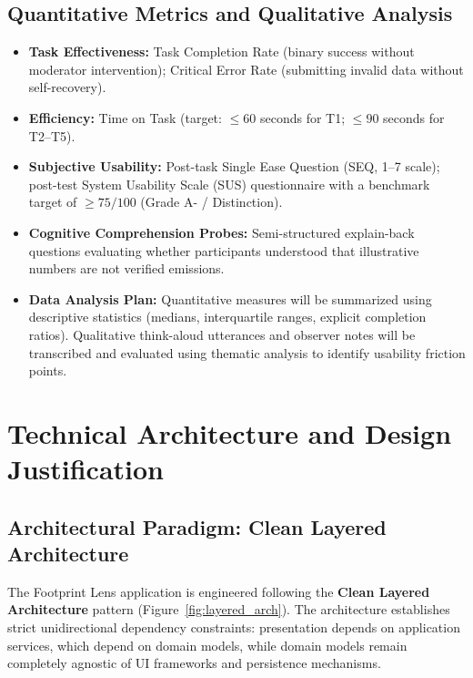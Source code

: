 \documentclass[12pt,a4paper]{article}
\begin{document}
\subsection{Quantitative Metrics and Qualitative Analysis}
\begin{itemize}[leftmargin=*]
  \item \textbf{Task Effectiveness:} Task Completion Rate (binary success without moderator intervention); Critical Error Rate (submitting invalid data without self-recovery).
  \item \textbf{Efficiency:} Time on Task (target: $\le 60$ seconds for T1; $\le 90$ seconds for T2--T5).
  \item \textbf{Subjective Usability:} Post-task Single Ease Question (SEQ, 1--7 scale); post-test System Usability Scale (SUS) questionnaire with a benchmark target of $\ge 75/100$ (Grade A- / Distinction).
  \item \textbf{Cognitive Comprehension Probes:} Semi-structured explain-back questions evaluating whether participants understood that illustrative numbers are not verified emissions.
  \item \textbf{Data Analysis Plan:} Quantitative measures will be summarized using descriptive statistics (medians, interquartile ranges, explicit completion ratios). Qualitative think-aloud utterances and observer notes will be transcribed and evaluated using thematic analysis to identify usability friction points.
\end{itemize}

\section{Technical Architecture and Design Justification}

\subsection{Architectural Paradigm: Clean Layered Architecture}
The Footprint Lens application is engineered following the \textbf{Clean Layered Architecture} pattern (Figure~\ref{fig:layered_arch}). The architecture establishes strict unidirectional dependency constraints: presentation depends on application services, which depend on domain models, while domain models remain completely agnostic of UI frameworks and persistence mechanisms.
\end{document}

